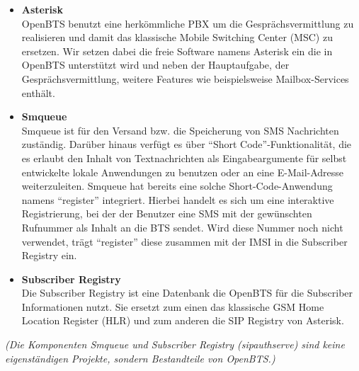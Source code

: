 \begin{itemize}
\item \textbf{Asterisk}\\
OpenBTS benutzt eine herkömmliche PBX um die Gesprächsvermittlung zu realisieren und damit das klassische Mobile Switching Center (MSC) zu ersetzen. Wir setzen dabei die freie Software namens Asterisk ein die in OpenBTS unterstützt wird und neben der Hauptaufgabe, der Gesprächsvermittlung, weitere Features wie beispielsweise Mailbox-Services enthält. 
\end{itemize}
\begin{itemize}
\item \textbf{Smqueue}\\
Smqueue ist für den Versand bzw. die Speicherung von SMS Nachrichten zuständig. Darüber hinaus verfügt es über "`Short Code"'-Funktionalität, die es erlaubt den Inhalt von Textnachrichten als Eingabeargumente für selbst entwickelte lokale Anwendungen zu benutzen oder an eine E-Mail-Adresse weiterzuleiten.
Smqueue hat bereits eine solche Short-Code-Anwendung namens "`register"' integriert. Hierbei handelt es sich um eine interaktive Registrierung, bei der der Benutzer eine SMS mit der gewünschten Rufnummer als Inhalt an die BTS sendet. Wird diese Nummer noch nicht verwendet, trägt "`register"' diese zusammen mit der IMSI in die Subscriber Registry ein. %
\end{itemize}
\begin{itemize}
\item \textbf{Subscriber Registry}\\
Die Subscriber Registry ist eine Datenbank die OpenBTS für die Subscriber Informationen nutzt. Sie ersetzt zum einen das klassische GSM Home Location Register (HLR) und zum anderen die SIP Registry von Asterisk.
\end{itemize}

\textit{(Die Komponenten Smqueue und Subscriber Registry (sipauthserve) sind keine eigenständigen Projekte, sondern Bestandteile von OpenBTS.)}\\

